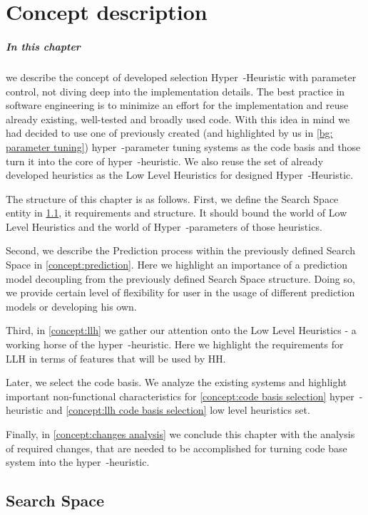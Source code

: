 \chapter{Concept description}
\paragraph{In this chapter} we describe the concept of developed selection Hyper~-Heuristic with parameter control, not diving deep into the implementation details.
The best practice in software engineering is to minimize an effort for the implementation and reuse already existing, well-tested and broadly used code.
With this idea in mind we had decided to use one of previously created (and highlighted by us in \ref{bg: parameter tuning}) hyper~-parameter tuning systems as the code basis and those turn it into the core of hyper~-heuristic.
We also reuse the set of already developed heuristics as the Low Level Heuristics for designed Hyper~-Heuristic.

The structure of this chapter is as follows.
First, we define the Search Space entity in \ref{concept:search space}, it requirements and structure. 
It should bound the world of Low Level Heuristics and the world of Hyper~-parameters of those heuristics.


Second, we describe the Prediction process within the previously defined Search Space in \ref{concept:prediction}.
Here we highlight an importance of a prediction model decoupling from the previously defined Search Space structure.
Doing so, we provide certain level of flexibility for user in the usage of different prediction models or developing his own.


Third, in \ref{concept:llh} we gather our attention onto the Low Level Heuristics - a working horse of the hyper~-heuristic.
Here we highlight the requirements for LLH in terms of features that will be used by HH.


Later, we select the code basis. We analyze the existing systems and highlight important non-functional characteristics for \ref{concept:code basis selection} hyper~-heuristic and \ref{concept:llh code basis selection} low level heuristics set.


Finally, in \ref{concept:changes analysis} we conclude this chapter with the analysis of required changes, that are needed to be accomplished for turning code base system into the hyper~-heuristic.


\section{Search Space}\label{concept:search space}
